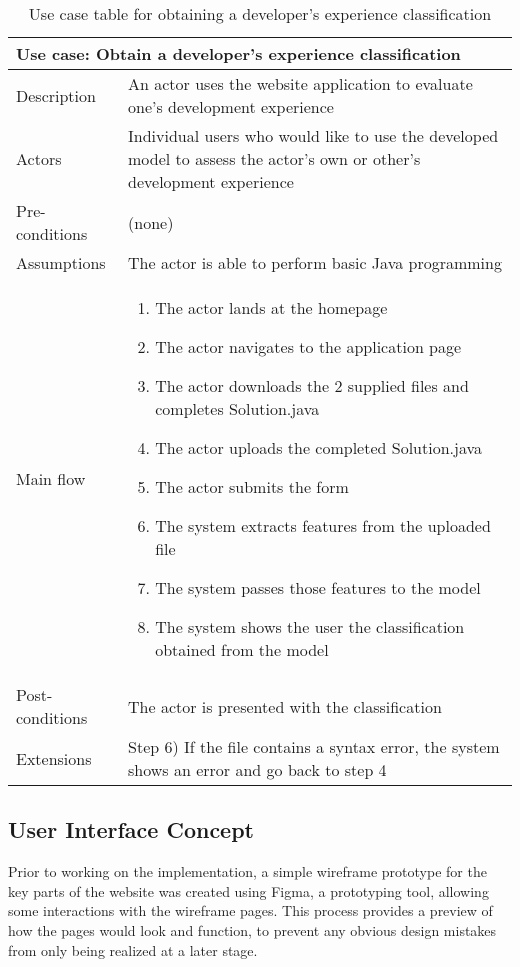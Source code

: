 \documentclass{report}
\begin{document}
\begin{table}[h!]
\centering
\begin{tabular}{|m{7em}|m{28em}|}
\hline
\multicolumn{2}{|l|}{Use case: Obtain a developer’s experience classification} \\
\hline
Description & An actor uses the website application to evaluate one’s development experience \\
\hline
Actors & Individual users who would like to use the developed model to assess the actor’s own or other’s development experience \\
\hline
Pre-conditions & (none) \\
\hline
Assumptions & The actor is able to perform basic Java programming \\
\hline
Main flow & 
\begin{enumerate}
\item The actor lands at the homepage
\item The actor navigates to the application page
\item The actor downloads the 2 supplied files and completes Solution.java
\item The actor uploads the completed Solution.java
\item The actor submits the form
\item The system extracts features from the uploaded file
\item The system passes those features to the model
\item The system shows the user the classification obtained from the model
\end{enumerate} \\
\hline
Post-conditions & The actor is presented with the classification \\
\hline
Extensions & Step 6) If the file contains a syntax error, the system shows an error and go back to step 4 \\
\hline
\end{tabular}
\caption{Use case table for obtaining a developer’s experience classification}
\label{tab:4.1}
\end{table}

\subsection{User Interface Concept}

Prior to working on the implementation, a simple wireframe prototype for the key parts of the website was created using Figma, a prototyping tool, allowing some interactions with the wireframe pages. This process provides a preview of how the pages would look and function, to prevent any obvious design mistakes from only being realized at a later stage.
\end{document}

